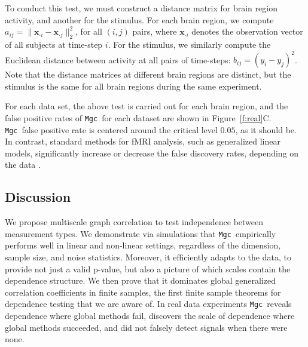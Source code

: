 \documentclass[11pt]{article}
\newcommand{\note}[2][]{\added[#1,remark={#2}]{}}
\providecommand{\sct}[1]{{\sc \texttt{#1}}}
\providecommand{\mb}[1]{\boldsymbol{#1}}
\newcommand{\Mgc}{\sct{Mgc}}
\newcommand{\cs}[1]{{\note{cs: #1}}}
\newcommand{\mbx}{\ensuremath{\mb{x}}}
\begin{document}
To conduct this test, we must construct a distance matrix for brain region activity, and another for the stimulus. For each brain region, we compute $a_{ij}=\|\mbx_{\cdot i}-\mbx_{\cdot j}\|_2^2$, for all $(i,j)$ pairs,  where $\mbx_{\cdot i}$ denotes the observation vector of all subjects at time-step $i$.
For the stimulus, we similarly compute the Euclidean distance between activity at all pairs of time-steps: $b_{ij}= (y_i - y_j)^2$.
\cs{am i right?}
Note that the distance matrices at different brain regions are distinct, but the stimulus is the same for all brain regions during the same experiment.

For each data set, the above test is carried out for each brain region, and the false positive rates of \Mgc~for each dataset are shown in Figure~\ref{f:real}C. %
\Mgc~false positive rate is centered around the critical level $0.05$, as it should be.
In contrast,  standard methods for fMRI analysis, such as generalized linear models, significantly increase  or decrease the false discovery rates, depending on the data \cite{EklundKnutsson2012,Eklund2015}.

\subsection*{Discussion}
\label{conclu}

We propose multiscale graph correlation to test independence between measurement types.
We demonstrate via simulations that \Mgc~empirically performs well in linear and non-linear settings, regardless of the dimension, sample size, and noise statistics.  Moreover, it efficiently adapts to the data, to provide not just a valid p-value, but also a picture of which scales contain the dependence structure. We then prove that it dominates global generalized correlation coefficients in finite samples, the first finite sample theorems for dependence testing that we are aware of.  
In real data experiments \Mgc~reveals dependence where global methods fail, discovers the scale of dependence where global methods succeeded, and did not falsely detect signals when there were none.
\end{document}
